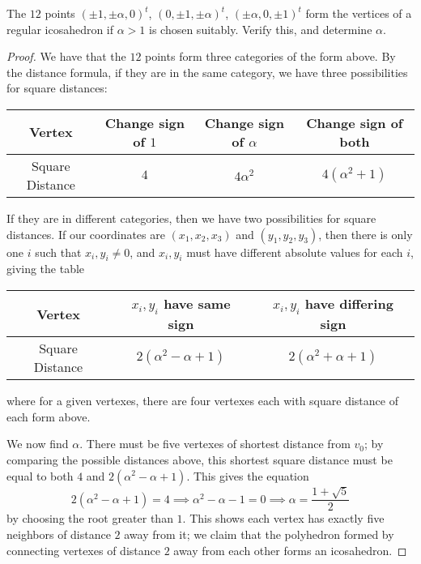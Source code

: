 \documentclass[12pt]{article}
\theoremstyle{remark}
\begin{document}
\setcounter{subsubsection}{6}
\begin{problem}
  The $12$ points $(\pm1,\pm\alpha,0)^t$, $(0,\pm1,\pm\alpha)^t$, $(\pm\alpha,0,\pm1)^t$ form the vertices of a regular icosahedron if $\alpha > 1$ is chosen suitably. Verify this, and determine $\alpha$.
\end{problem}
\begin{proof}
  We have that the $12$ points form three categories of the form above. By the distance formula, if they are in the same category, we have three possibilities for square distances:
  \begin{center}
    \begin{tabular}{c|ccc}
      Vertex          & Change sign of $1$ & Change sign of $\alpha$ & Change sign of both\\
      \hline
      Square Distance & $4$ & $4\alpha^2$ & $4(\alpha^2+1)$
    \end{tabular}
  \end{center}
  If they are in different categories, then we have two possibilities for square distances. If our coordinates are $(x_1,x_2,x_3)$ and $(y_1,y_2,y_3)$, then there is only one $i$ such that $x_i,y_i \ne 0$, and $x_i,y_i$ must have different absolute values for each $i$, giving the table
  \begin{center}
    \begin{tabular}{c|cc}
      Vertex          & $x_i,y_i$ have same sign & $x_i,y_i$ have differing sign\\
      \hline
      Square Distance & $2(\alpha^2 - \alpha+1)$ & $2(\alpha^2 + \alpha+1)$
    \end{tabular}
  \end{center}
  where for a given vertexes, there are four vertexes each with square distance of each form above.
  \par We now find $\alpha$. There must be five vertexes of shortest distance from $v_0$; by comparing the possible distances above, this shortest square distance must be equal to both $4$ and $2(\alpha^2-\alpha+1)$. This gives the equation
  \begin{equation*}
    2(\alpha^2-\alpha+1) = 4 \implies \alpha^2 - \alpha - 1 = 0 \implies \alpha = \frac{1 + \sqrt{5}}{2}
  \end{equation*}
  by choosing the root greater than $1$. This shows each vertex has exactly five neighbors of distance $2$ away from it; we claim that the polyhedron formed by connecting vertexes of distance $2$ away from each other forms an icosahedron.

\end{proof}
\end{document}
